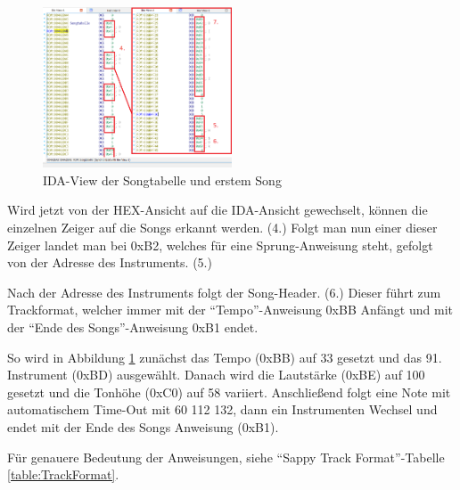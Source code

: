 \documentclass[11pt,a4paper]{scrartcl}
\begin{document}
\begin{figure}
	\vspace{-10pt}
	\begin{center}
		\includegraphics[width=0.5\textwidth]{SongtabellenHeader}
	\end{center}
	\vspace{-10pt}
	\caption{IDA-View der Songtabelle und erstem Song}
	\label{fig:IDA-view}
	\vspace{-40pt}
\end{figure}


Wird jetzt von der HEX-Ansicht auf die IDA-Ansicht gewechselt, k\"{o}nnen die einzelnen Zeiger auf die Songs erkannt werden. (4.)
Folgt man nun einer dieser Zeiger landet man bei 0xB2, welches f\"{u}r eine Sprung-Anweisung steht, gefolgt von der Adresse des Instruments. (5.)

Nach der Adresse des Instruments folgt der Song-Header. (6.) Dieser f\"{u}hrt zum Trackformat, welcher immer mit der "`Tempo"'-Anweisung 0xBB Anf\"{a}ngt und mit der "`Ende des Songs"'-Anweisung 0xB1 endet. 

So wird in Abbildung \ref{fig:IDA-view} zun\"{a}chst das Tempo (0xBB) auf 33 gesetzt und das 91. Instrument (0xBD) ausgew\"{a}hlt. Danach wird die Lautst\"{a}rke (0xBE) auf 100 gesetzt und die Tonh\"{o}he (0xC0) auf 58 variiert. Anschlie{\ss}end folgt eine Note mit automatischem Time-Out mit 60 112 132, dann ein Instrumenten Wechsel und endet mit der Ende des Songs Anweisung (0xB1). 

F\"{u}r genauere Bedeutung der Anweisungen, siehe "`Sappy Track Format"'-Tabelle \ref{table:TrackFormat}.

\newpage 
\end{document}
